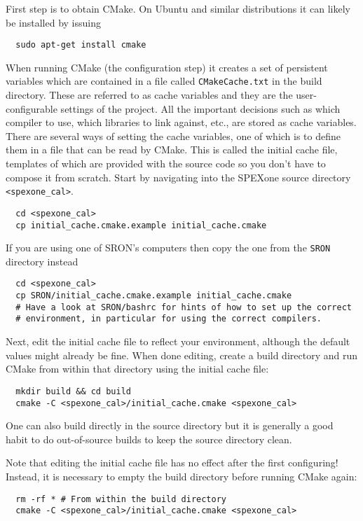 \documentclass{article}
\begin{document}
First step is to obtain CMake. On Ubuntu and similar distributions it can likely be installed by issuing
\begin{lstlisting}
  sudo apt-get install cmake
\end{lstlisting}
When running CMake (the configuration step) it creates a set of persistent variables which are contained in a file called \lstinline!CMakeCache.txt! in the build directory. These are referred to as cache variables and they are the user-configurable settings of the project. All the important decisions such as which compiler to use, which libraries to link against, etc., are stored as cache variables. There are several ways of setting the cache variables, one of which is to define them in a file that can be read by CMake. This is called the initial cache file, templates of which are provided with the source code so you don't have to compose it from scratch. Start by navigating into the SPEXone source directory \lstinline!<spexone_cal>!.
\begin{lstlisting}
  cd <spexone_cal>
  cp initial_cache.cmake.example initial_cache.cmake
\end{lstlisting}
If you are using one of SRON's computers then copy the one from the \lstinline!SRON! directory instead
\begin{lstlisting}
  cd <spexone_cal>
  cp SRON/initial_cache.cmake.example initial_cache.cmake
  # Have a look at SRON/bashrc for hints of how to set up the correct
  # environment, in particular for using the correct compilers.
\end{lstlisting}
Next, edit the initial cache file to reflect your environment, although the default values might already be fine. When done editing, create a build directory and run CMake from within that directory using the initial cache file:
\begin{lstlisting}
  mkdir build && cd build
  cmake -C <spexone_cal>/initial_cache.cmake <spexone_cal>
\end{lstlisting}
One can also build directly in the source directory but it is generally a good habit to do out-of-source builds to keep the source directory clean.

Note that editing the initial cache file has no effect after the first configuring! Instead, it is necessary to empty the build directory before running CMake again:
\begin{lstlisting}
  rm -rf * # From within the build directory
  cmake -C <spexone_cal>/initial_cache.cmake <spexone_cal>
\end{lstlisting}
\end{document}
